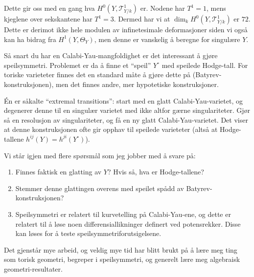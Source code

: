 \documentclass[11pt, norsk]{article}
\begin{document}
Dette gir oss med en gang hva $H^0(Y,\mathcal T^1_{Y/k})$ er. Nodene har $T^1=1$, mens kjeglene over sekskantene har $T^1=3$. Dermed har vi at $\dim_k H^0(Y,\mathcal T^1_{Y/k})$ er $72$. Dette er derimot ikke hele modulen av infinetesimale deformasjoner siden vi også kan ha bidrag fra $H^1(Y,\Theta_Y)$, men denne er vanskelig å beregne for singulære $Y$.

Så snart du har en Calabi-Yau-mangfoldighet er det interessant å gjøre speilsymmetri. Problemet er da å finne et ``speil'' $Y^\circ$ med speilede Hodge-tall. For toriske varieteter finnes det en standard måte å gjøre dette på (Batyrev-konstruksjonen), men det finnes andre, mer hypotetiske konstruksjoner.

Én er såkalte ``extremal transitions'': start med en glatt Calabi-Yau-varietet, og degenerer denne til en singulær varietet med ikke altfor gærne singulariteter. Gjør så en resolusjon av singulariteter, og få en ny glatt Calabi-Yau-varietet. Det viser at denne konstruksjonen ofte gir opphav til speilede varieteter (altså at Hodge-tallene $h^{ij}(Y)=h^{ji}(Y^\circ)$). 

Vi står igjen med flere spørsmål som jeg jobber med å svare på:
\begin{enumerate}
\item Finnes faktisk en glatting av $Y$? Hvis så, hva er Hodge-tallene?
\item Stemmer denne glattingen overens med speilet spådd av Batyrev-konstruksjonen? 
\item Speilsymmetri er relatert til kurvetelling på Calabi-Yau-ene, og dette er relatert til å løse noen differensiallikninger definert ved potensrekker. Disse kan løses for å teste speilsymmetriforutsigelsene. 
\end{enumerate}

Det gjenstår mye arbeid, og veldig mye tid har blitt brukt på å lære meg ting som torisk geometri, begreper i speilsymmetri, og generelt lære meg algebraisk geometri-resultater.
\end{document}
